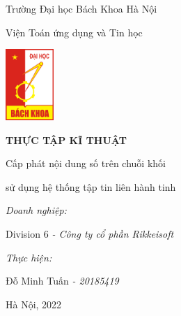 \begin{titlepage}
    \centering
    \vspace{0.25cm}
    {\large Trường Đại học Bách Khoa Hà Nội\par}
    \vspace{0.25cm}
    {\normalsize Viện Toán ứng dụng và Tin học\par}
    \vspace{0.75cm}
    {\includegraphics[width=69px]{anh/hust-logo.png}\par}
    \vspace{1cm}
    {\Large\textbf{THỰC TẬP KĨ THUẬT}\par}
    \vspace{1.25cm}
    {\large Cấp phát nội dung số trên chuỗi khối\par}
    \vspace{0.25cm}
    {\large sử dụng hệ thống tập tin liên hành tinh\par}
    \vspace{1.5cm}
    \begin{flushleft}
        \hspace{3cm}
        {\normalsize\textit{Doanh nghiệp:}\par}
        \vspace{0.125cm}
        \hspace{5cm}
        {\normalsize Division 6 \textit{- Công ty cổ phần Rikkeisoft}\par}
        \vspace{0.125cm}
        \hspace{3cm}
        {\normalsize\textit{Thực hiện:}\par}
        \vspace{0.125cm}
        \hspace{5cm}
        {\normalsize Đỗ Minh Tuấn \textit{- 20185419}\par}
    \end{flushleft}
    \vspace{3cm}
    {\normalsize Hà Nội, 2022\par}
    \vspace{0.5cm}
\end{titlepage}